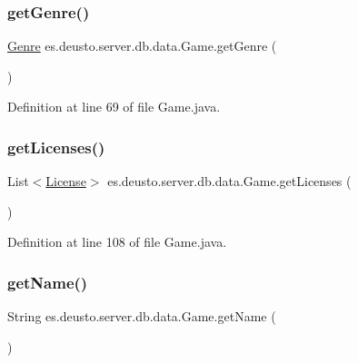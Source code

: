 \subsubsection{\texorpdfstring{get\+Genre()}{getGenre()}}
{\footnotesize\ttfamily \hyperlink{classes_1_1deusto_1_1server_1_1db_1_1data_1_1_genre}{Genre} es.\+deusto.\+server.\+db.\+data.\+Game.\+get\+Genre (\begin{DoxyParamCaption}{ }\end{DoxyParamCaption})}



Definition at line 69 of file Game.\+java.

\mbox{\label{classes_1_1deusto_1_1server_1_1db_1_1data_1_1_game_a6da5b38821b5c9bcb71b26721af09bf0}} 
\subsubsection{\texorpdfstring{get\+Licenses()}{getLicenses()}}
{\footnotesize\ttfamily List$<$\hyperlink{classes_1_1deusto_1_1server_1_1db_1_1data_1_1_license}{License}$>$ es.\+deusto.\+server.\+db.\+data.\+Game.\+get\+Licenses (\begin{DoxyParamCaption}{ }\end{DoxyParamCaption})}



Definition at line 108 of file Game.\+java.

\mbox{\label{classes_1_1deusto_1_1server_1_1db_1_1data_1_1_game_af9f6defe43d11cefdef169a6aaa87ae7}} 
\subsubsection{\texorpdfstring{get\+Name()}{getName()}}
{\footnotesize\ttfamily String es.\+deusto.\+server.\+db.\+data.\+Game.\+get\+Name (\begin{DoxyParamCaption}{ }\end{DoxyParamCaption})}



